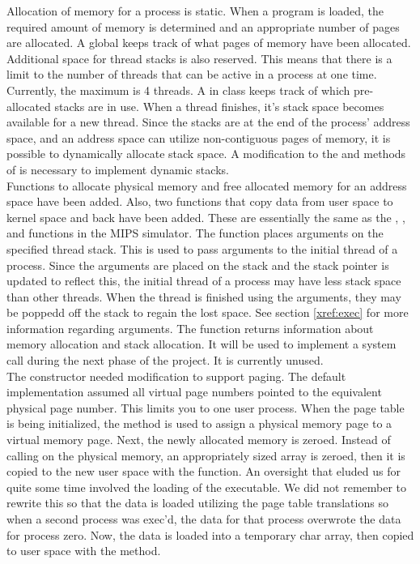     Allocation of memory for a process is static. When a program is loaded, the required
    amount of memory is determined and an appropriate number of pages are allocated. A
    global  keeps track of what pages of memory have been allocated.
    Additional space for thread stacks is also reserved. This means that there is a
    limit to the number of threads that can be active in a process at one time.
    Currently, the maximum is 4 threads. A  in class  keeps
    track of which pre-allocated stacks are in use. When a thread finishes, it's stack
    space becomes available for a new thread. Since the stacks are at the end of the
    process' address space, and an address space can utilize non-contiguous pages of
    memory, it is possible to dynamically allocate stack space. A modification to the
     and  methods of  is necessary
    to implement dynamic stacks.\\

    Functions to allocate physical memory and free allocated memory for an address space
    have been added. Also, two functions that copy data from user space to kernel space
    and back have been added. These are essentially the same as the ,
    , and  functions in the MIPS simulator. The
     function places  arguments on the specified thread
    stack. This is used to pass  arguments to the initial thread of a
    process. Since the arguments are placed on the stack and the stack pointer is updated
    to reflect this, the initial thread of a process may have less stack space than other
    threads. When the thread is finished using the arguments, they may be poppedd off the
    stack to regain the lost space. See section \ref{xref:exec} for more
    information regarding arguments. The  function returns information
    about memory allocation and stack allocation. It will be used to implement a
     system call during the next phase of the project. It is currently
    unused.\\

    The  constructor needed modification to support paging. The default
    implementation assumed all virtual page numbers pointed to the equivalent physical
    page number. This limits you to one user process. When the page table is being
    initialized, the  method is used to assign a physical memory
    page to a virtual memory page. Next, the newly allocated memory is zeroed. Instead of
    calling  on the physical memory, an appropriately sized array is zeroed,
    then it is copied to the new user space with the  function. An
    oversight that eluded us for quite some time involved the loading of the executable.
    We did not remember to rewrite this so that the data is loaded utilizing the page
    table translations so when a second process was exec'd, the data for that process
    overwrote the data for process zero. Now, the data is loaded into a temporary char
    array, then copied to user space with the  method.\\
  
